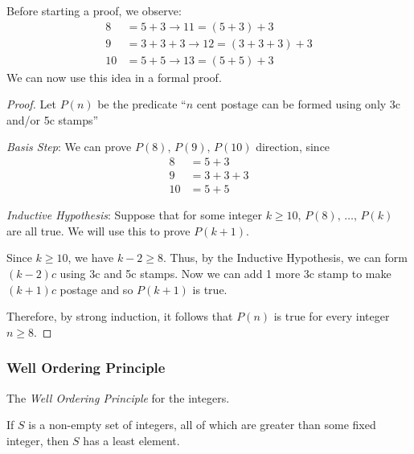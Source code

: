 Before starting a proof, we observe:
\begin{align*}
	8 &= 5 + 3 \rightarrow 11 = (5 + 3) + 3 \\
	9 &= 3 + 3 + 3 \rightarrow 12 = (3 + 3 + 3) + 3 \\
	10 &= 5 + 5 \rightarrow 13 = (5+5)+3
\end{align*}
We can now use this idea in a formal proof.
\begin{proof}
	Let $P(n)$ be the predicate ``$n$ cent postage can be formed using only 3c and/or 5c stamps''

	\emph{Basis Step}: We can prove $P(8),\,P(9),\,P(10)$ direction, since
	\begin{align*}
		8 &= 5 + 3 \\
		9 &= 3 + 3 + 3 \\
		10 &= 5 + 5
	\end{align*}

	\emph{Inductive Hypothesis}: Suppose that for some integer $k \geq 10$, $P(8),\,\dots,\,P(k)$ are all true. We will use this to prove $P(k+1)$.

	Since $k\geq 10$, we have $k - 2 \geq 8$. Thus, by the Inductive Hypothesis, we can form $(k-2)c$ using 3c and 5c stamps. Now we can add 1 more 3c stamp to make $(k+1)c$ postage and so $P(k+1)$ is true.

	Therefore, by strong induction, it follows that $P(n)$ is true for every integer $n\geq 8$.
\end{proof}
\newpage
\subsubsection{Well Ordering Principle}
\begin{definition}
	The \emph{Well Ordering Principle} for the integers.

	If $S$ is a non-empty set of integers, all of which are greater than some fixed integer, then $S$ has a least element.
\end{definition}
